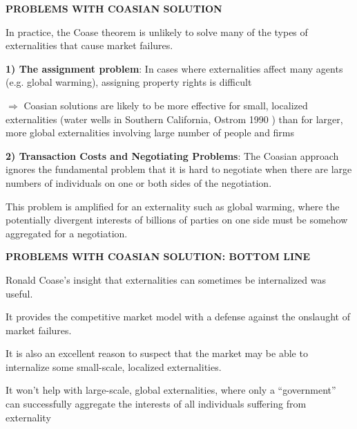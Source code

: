 \documentclass[landscape]{slides}
\begin{document}
\begin{slide}
\begin{center}
{\bf PROBLEMS WITH COASIAN SOLUTION}
\end{center}

In practice, the Coase theorem is unlikely to solve many of the types of externalities that cause market failures.

{\bf 1) The assignment problem}: In cases where externalities affect many agents (e.g. global warming),
assigning property rights is difficult 

\small
$\Rightarrow$ Coasian solutions are likely to be more effective for small, localized externalities (water wells in Southern California, Ostrom 1990 ) than for larger, more global externalities involving large number of people and firms
\normalsize

%
%


{\bf 2) Transaction Costs and Negotiating Problems}:
The Coasian approach ignores the fundamental problem that it is hard to negotiate when there are large numbers of individuals on one or both sides of the negotiation.

\small This problem is amplified for an externality such as global warming, where the potentially divergent interests of billions of parties on one side must be somehow aggregated for a negotiation.
\end{slide}

\begin{slide}
\begin{center}
{\bf PROBLEMS WITH COASIAN SOLUTION: BOTTOM LINE}
\end{center}
Ronald Coase's insight that externalities can sometimes be internalized was useful.

It provides the competitive market model with a defense against the onslaught of market failures.

It is also an excellent reason to suspect that the market may be able to internalize some small-scale, localized externalities.

It won't help with large-scale, global externalities, where only a ``government'' can successfully
aggregate the interests of all individuals suffering from externality

\end{slide}
\end{document}
